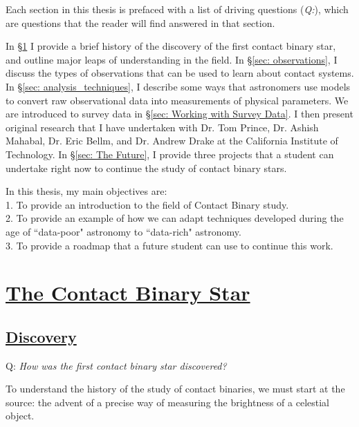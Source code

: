 \documentclass[12pt]{article} %
\numberwithin{equation}{section} %
\begin{document}
Each section in this thesis is prefaced with a list of driving questions (\emph{Q:}), which are questions that the reader will find answered in that section.

In \S \ref{sec: background} I provide a brief history of the discovery of the first contact binary star, and outline major leaps of understanding in the field. In \S\ref{sec: observations}, I discuss the types of observations that can be used to learn about contact systems. In \S\ref{sec: analysis_techniques}, I describe some ways that astronomers use models to convert raw observational data into measurements of physical parameters. We are introduced to survey data in \S\ref{sec: Working with Survey Data}. I then present original research that I have undertaken with Dr. Tom Prince, Dr. Ashish Mahabal, Dr. Eric Bellm, and Dr. Andrew Drake at the California Institute of Technology. In \S\ref{sec: The Future}, I provide three projects that a student can undertake right now to continue the study of contact binary stars.


In this thesis, my main objectives are: \\

1. To provide an introduction to the field of Contact Binary study. \\
2. To provide an example of how we can adapt techniques developed during the age of ``data-poor" astronomy to ``data-rich" astronomy. \\
3. To provide a roadmap that a future student can use to continue this work. \\

\section[The Contact Binary Star]{\hyperlink{toc}{The Contact Binary Star}} \label{sec: background}

\subsection[\emph{Discovery}]{\hyperlink{toc}{Discovery}}

Q: \emph{How was the first contact binary star discovered?}

To understand the history of the study of contact binaries, we must start at the source: the advent of a precise way of measuring the brightness of a celestial object.  
\end{document}
